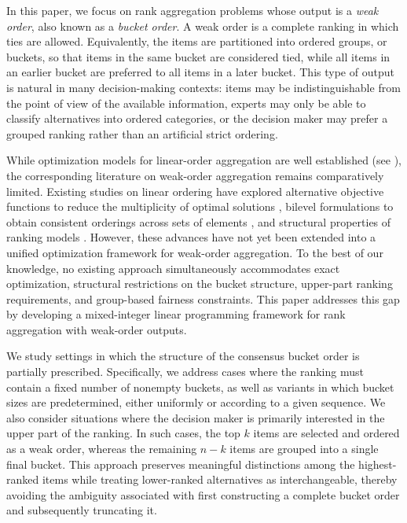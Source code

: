 \documentclass[pdflatex,basic,Numbered]{jnl}%
\theoremstyle{plain}
\theoremstyle{remark}
\theoremstyle{thmstyleone}%
\theoremstyle{thmstylethree}%
\begin{document}
In this paper, we focus on rank aggregation problems whose output is a \emph{weak order}, also known as a \emph{bucket order}. A weak order is a complete ranking in which ties are allowed. Equivalently, the items are partitioned into ordered groups, or buckets, so that items in the same bucket are considered tied, while all items in an earlier bucket are preferred to all items in a later bucket. This type of output is natural in many decision-making contexts: items may be indistinguishable from the point of view of the available information, experts may only be able to classify alternatives into ordered categories, or the decision maker may prefer a grouped ranking rather than an artificial strict ordering.

While optimization models for linear-order aggregation are well established (see \cite{alcaraz2022rank}), the corresponding literature on weak-order aggregation remains comparatively limited. Existing studies on linear ordering have explored alternative objective functions to reduce the multiplicity of optimal solutions \citep{benito2025multiple}, bilevel formulations to obtain consistent orderings across sets of elements \citep{labbe2023bilevel}, and structural properties of ranking models \citep{ceberio2015linear, martin2025improving}. However, these advances have not yet been extended into a unified optimization framework for weak-order aggregation. To the best of our knowledge, no existing approach simultaneously accommodates exact optimization, structural restrictions on the bucket structure, upper-part ranking requirements, and group-based fairness constraints. This paper addresses this gap by developing a mixed-integer linear programming framework for rank aggregation with weak-order outputs. 


We study settings in which the structure of the consensus bucket order is partially prescribed. Specifically, we address cases where the ranking must contain a fixed number of nonempty buckets, as well as variants in which bucket sizes are predetermined, either uniformly or according to a given sequence. We also consider situations where the decision maker is primarily interested in the upper part of the ranking. In such cases, the top $k$ items are selected and ordered as a weak order, whereas the remaining $n-k$ items are grouped into a single final bucket. This approach preserves meaningful distinctions among the highest-ranked items while treating lower-ranked alternatives as interchangeable, thereby avoiding the ambiguity associated with first constructing a complete bucket order and subsequently truncating it.
\end{document}
